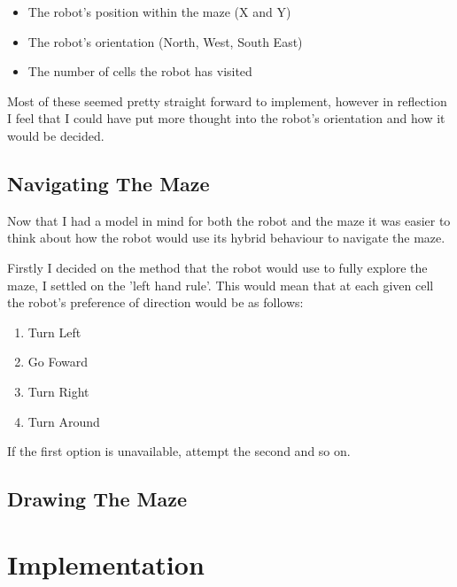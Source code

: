 \documentclass[a4paper]{article}
\begin{document}
	\begin{itemize}
		\item The robot's position within the maze (X and Y)
		\item The robot's orientation (North, West, South East)
		\item The number of cells the robot has visited\\
	\end{itemize}
	
	Most of these seemed pretty straight forward to implement, however in reflection I feel that I could have put more thought into the robot's orientation and how it would be decided.
	
	\subsection{Navigating The Maze}
	Now that I had a model in mind for both the robot and the maze it was easier to think about how the robot would use its hybrid behaviour to navigate the maze. 
	

	Firstly I decided on the method that the robot would use to fully explore the maze, I settled on the 'left hand rule'. This would mean that at each given cell the robot's preference of direction would be as follows:\\
	
	\begin{enumerate}
		\item Turn Left
		\item Go Foward
		\item Turn Right
		\item Turn Around\\
	\end{enumerate}
	
	If the first option is unavailable, attempt the second and so on.
	
	
	\subsection{Drawing The Maze}
	
	
	
	
	
	\section{Implementation}
\end{document}
